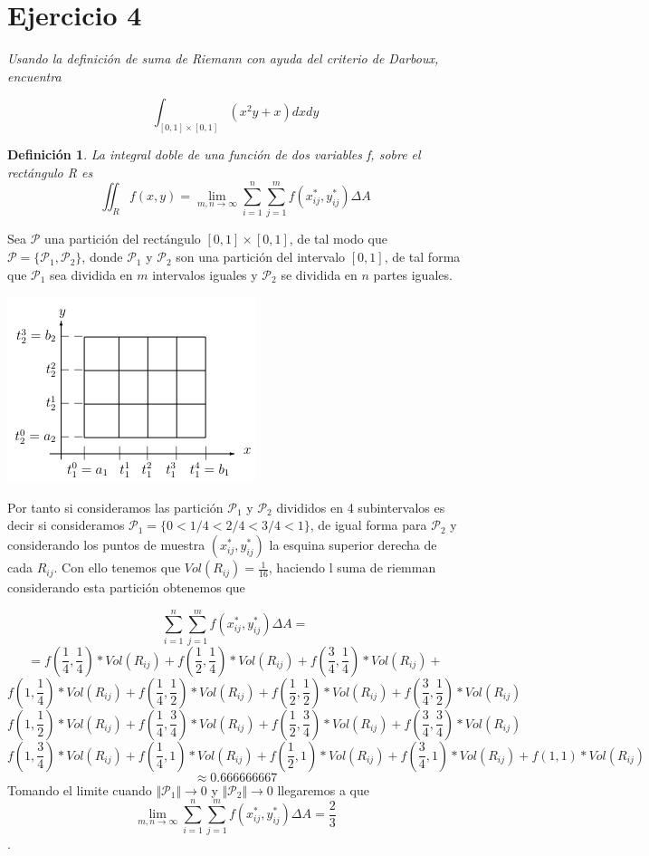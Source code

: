 \documentclass[a4paper,12pt]{article}
\newtheorem{definicion}{Definición}[subsection]
\begin{document}
\section{Ejercicio 4}
\textit{Usando la definición de suma de Riemann con ayuda del criterio de Darboux, encuentra}

\[\int_{[0,1] \times [0,1]} (x^2y+x)dxdy\]

\begin{definicion}
    La integral doble de una función de dos variables f, sobre el rectángulo R es
    \[\iint_{R} f(x,y) = \lim_{m,n \rightarrow \infty} \sum_{i= 1}^{n} \sum_{j=1}^{m} f(x_{ij}^{*},y_{ij}^{*}) \varDelta A\]
\end{definicion}

Sea $\mathcal{P}$ una partición del rectángulo $[0,1] \times [0,1]$, de tal modo que
$\mathcal{P} = \lbrace \mathcal{P}_1, \mathcal{P}_2 \rbrace$, donde $\mathcal{P}_1$ y $\mathcal{P}_2$ son una partición
del intervalo $[0,1]$, de tal forma que $\mathcal{P}_1$ sea dividida en $m$ intervalos iguales y $\mathcal{P}_2$ se dividida
en $n$ partes iguales.
\begin{center}
    \includegraphics[scale=0.5]{riemman.png}
\end{center}

Por tanto si consideramos las partición $\mathcal{P}_1$ y $\mathcal{P}_2$ divididos en 4 subintervalos es decir si
consideramos $\mathcal{P}_1 = \lbrace 0 < 1/4 < 2/4 < 3/4 < 1 \rbrace$, de igual forma para $\mathcal{P}_2$ y considerando
los puntos de muestra $(x_{ij}^{*},y_{ij}^{*})$ la esquina superior derecha de cada $R_{ij}$. Con ello tenemos que
$Vol(R_{ij}) = \frac{1}{16}$, haciendo l suma de riemman considerando esta partición obtenemos que

\[\sum_{i= 1}^{n} \sum_{j=1}^{m} f(x_{ij}^{*},y_{ij}^{*}) \varDelta A = \]
\[ = f(\frac{1}{4},\frac{1}{4})*Vol(R_{ij}) + f(\frac{1}{2},\frac{1}{4})*Vol(R_{ij})+ f(\frac{3}{4},\frac{1}{4})*Vol(R_{ij})+\]
\[f(1,\frac{1}{4})*Vol(R_{ij}) + f(\frac{1}{4},\frac{1}{2})*Vol(R_{ij})+ f(\frac{1}{2},\frac{1}{2})*Vol(R_{ij}) + f(\frac{3}{4},\frac{1}{2})*Vol(R_{ij})\]
\[f(1,\frac{1}{2})*Vol(R_{ij}) + f(\frac{1}{4},\frac{3}{4})*Vol(R_{ij})+ f(\frac{1}{2},\frac{3}{4})*Vol(R_{ij}) + f(\frac{3}{4},\frac{3}{4})*Vol(R_{ij})\]
\[f(1,\frac{3}{4})*Vol(R_{ij}) + f(\frac{1}{4},1)*Vol(R_{ij})+ f(\frac{1}{2},1)*Vol(R_{ij}) + f(\frac{3}{4},1)*Vol(R_{ij}) + f(1,1)*Vol(R_{ij}) \]
\[≈ 0.666666667\]
Tomando el limite cuando $\Vert \mathcal{P}_1 \Vert \rightarrow 0$  y $\Vert \mathcal{P}_2 \Vert \rightarrow 0$ llegaremos
a que
\[\lim_{m,n \rightarrow \infty} \sum_{i= 1}^{n} \sum_{j=1}^{m} f(x_{ij}^{*},y_{ij}^{*}) \varDelta A = \frac{2}{3}\].
\end{document}
